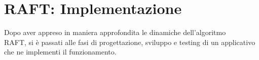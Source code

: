 \chapter{RAFT: Implementazione}
	Dopo aver appreso in maniera approfondita le dinamiche dell'algoritmo\\ RAFT, si è passati alle fasi di progettazione, sviluppo e testing di un applicativo che ne implementi il funzionamento. 







